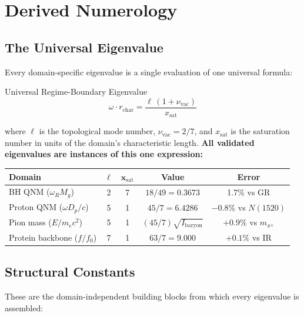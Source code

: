 \section{Derived Numerology}
\label{sec:qnm_numerology}

\subsection{The Universal Eigenvalue}

Every domain-specific eigenvalue is a single evaluation of one universal formula:

\begin{resultbox}{Universal Regime-Boundary Eigenvalue}
\begin{equation}
    \omega \cdot r_\mathrm{char} = \frac{\ell\,(1 + \nu_\mathrm{vac})}{x_\mathrm{sat}}
    \label{eq:universal_eigenvalue}
\end{equation}
\end{resultbox}

\noindent where $\ell$ is the topological mode number, $\nu_\mathrm{vac} = 2/7$, and $x_\mathrm{sat}$ is the saturation number in units of the domain's characteristic length.  \textbf{All validated eigenvalues are instances of this one expression:}

\begin{center}
\renewcommand{\arraystretch}{1.3}
\begin{tabular}{l c c c c}
\toprule
\textbf{Domain} & $\bm{\ell}$ & $\bm{x_\mathrm{sat}}$ & \textbf{Value} & \textbf{Error} \\
\midrule
BH QNM ($\omega_R M_g$) & 2 & 7 & $18/49 = 0.3673$ & 1.7\% vs GR \\
Proton QNM ($\omega D_p/c$) & 5 & 1 & $45/7 = 6.4286$ & $-0.8\%$ vs $N(1520)$ \\
Pion mass ($E/m_e c^2$) & 5 & 1 & $(45/7)\sqrt{I_\mathrm{baryon}}$ & $+0.9\%$ vs $m_{\pi^\pm}$ \\
Protein backbone ($f/f_0$) & 7 & 1 & $63/7 = 9.000$ & $+0.1\%$ vs IR \\
\bottomrule
\end{tabular}
\end{center}

\subsection{Structural Constants}

These are the domain-independent building blocks from which every eigenvalue is assembled:

